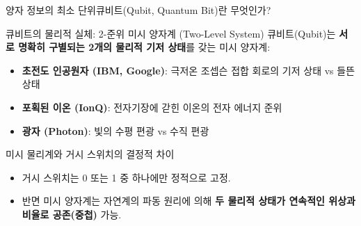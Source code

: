 \documentclass[aspectratio=169, 10pt]{beamer}
\begin{document}
\begin{frame}{양자 정보의 최소 단위}{큐비트(Qubit, Quantum Bit)란 무엇인가?}
    \pause
    \begin{block}{큐비트의 물리적 실체: 2-준위 미시 양자계 (Two-Level System)}
        큐비트(Qubit)는 \textbf{서로 명확히 구별되는 2개의 물리적 기저 상태}를 갖는 미시 양자계:\pause
        \begin{itemize}
            \item \textbf{초전도 인공원자 (IBM, Google)}: 극저온 조셉슨 접합 회로의 기저 상태 vs 들뜬 상태
            \item \textbf{포획된 이온 (IonQ)}: 전자기장에 갇힌 이온의 전자 에너지 준위
            \item \textbf{광자 (Photon)}: 빛의 수평 편광 vs 수직 편광
        \end{itemize}
    \end{block}
    \vspace{0.2cm}
    \pause
    \begin{exampleblock}{미시 물리계와 거시 스위치의 결정적 차이}
        \begin{itemize}
            \item 거시 스위치는 0 또는 1 중 하나에만 정적으로 고정.\pause
            \item 반면 미시 양자계는 자연계의 파동 원리에 의해 \textbf{두 물리적 상태가 연속적인 위상과 비율로 공존(중첩)} 가능.
        \end{itemize}
    \end{exampleblock}
\end{frame}
\end{document}
